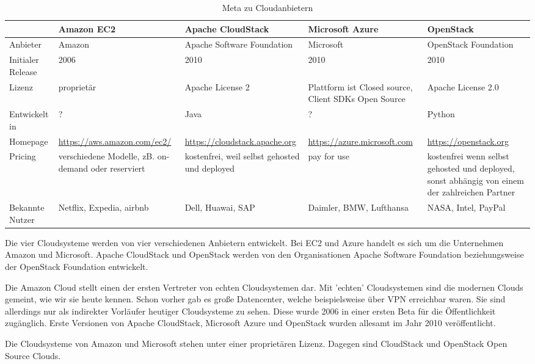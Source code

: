 \documentclass[a4paper,10pt]{article}
\numberwithin{figure}{section}
\numberwithin{table}{section}
\begin{document}
\begin{table}[H]
\centering
\caption{Meta zu Cloudanbietern}
\label{my-label}
\renewcommand{\arraystretch}{1.5}
\begin{tabular}{p{1.5cm} p{2.3cm} p{2.3cm} p{2.3cm} p{2.3cm} }
\hline
 & Amazon EC2 & Apache CloudStack & Microsoft Azure & OpenStack\\
\hline
Anbieter & Amazon & Apache Software Foundation & Microsoft & OpenStack Foundation \footnotemark \\
Initialer Release & 2006 & 2010 & 2010 & 2010 \\
Lizenz & proprietär & Apache License 2 & Plattform ist Closed source, Client SDKs Open Source & Apache License 2.0\\
Entwickelt in & ? & Java & ? & Python\\
Homepage & \url{https://aws.amazon.com/ec2/} & \url{https://cloudstack.apache.org} & \url{https://azure.microsoft.com} & \url{https://openstack.org} \\
Pricing & verschiedene Modelle, zB. on-demand oder reserviert & kostenfrei, weil selbst gehosted und deployed & pay for use & kostenfrei wenn selbst gehosted und deployed, sonst abhängig von einem der zahlreichen Partner\\
Bekannte Nutzer & Netflix, Expedia, airbnb & Dell, Huawai, SAP & Daimler, BMW, Lufthansa & NASA, Intel, PayPal\\
\hline
\end{tabular}
\end{table}

Die vier Cloudsysteme werden von vier verschiedenen Anbietern entwickelt.
Bei EC2 und Azure handelt es sich um die Unternehmen Amazon und Microsoft.
Apache CloudStack und OpenStack werden von den Organisationen Apache Software Foundation beziehungsweise der OpenStack Foundation entwickelt.

Die Amazon Cloud stellt einen der ersten Vertreter von echten Cloudsystemen dar.
Mit 'echten' Cloudsystemen sind die modernen Clouds gemeint, wie wir sie heute kennen.
Schon vorher gab es große Datencenter, welche beispielsweise über VPN erreichbar waren.
Sie sind allerdings nur als indirekter Vorläufer heutiger Cloudsysteme zu sehen.
Diese wurde 2006 in einer ersten Beta für die Öffentlichkeit zugänglich.
Erste Versionen von Apache CloudStack, Microsoft Azure und OpenStack wurden allesamt im Jahr 2010 veröffentlicht.

Die Cloudsysteme von Amazon und Microsoft stehen unter einer proprietären Lizenz.
Dagegen sind CloudStack und OpenStack Open Source Clouds.
\end{document}
